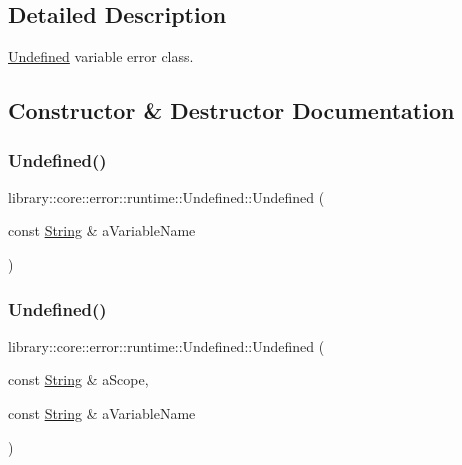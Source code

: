 \subsection{Detailed Description}
\hyperlink{classlibrary_1_1core_1_1error_1_1runtime_1_1Undefined}{Undefined} variable error class. 

\subsection{Constructor \& Destructor Documentation}
\mbox{\label{classlibrary_1_1core_1_1error_1_1runtime_1_1Undefined_a585cecbe505147926980971fed942b95}} 
\subsubsection{\texorpdfstring{Undefined()}{Undefined()}\hspace{0.1cm}{\footnotesize\ttfamily [1/2]}}
{\footnotesize\ttfamily library\+::core\+::error\+::runtime\+::\+Undefined\+::\+Undefined (\begin{DoxyParamCaption}\item[{const \hyperlink{classlibrary_1_1core_1_1types_1_1String}{String} \&}]{a\+Variable\+Name }\end{DoxyParamCaption})}

\mbox{\label{classlibrary_1_1core_1_1error_1_1runtime_1_1Undefined_a61e341571e36a63bd0894c82b6be7427}} 
\subsubsection{\texorpdfstring{Undefined()}{Undefined()}\hspace{0.1cm}{\footnotesize\ttfamily [2/2]}}
{\footnotesize\ttfamily library\+::core\+::error\+::runtime\+::\+Undefined\+::\+Undefined (\begin{DoxyParamCaption}\item[{const \hyperlink{classlibrary_1_1core_1_1types_1_1String}{String} \&}]{a\+Scope,  }\item[{const \hyperlink{classlibrary_1_1core_1_1types_1_1String}{String} \&}]{a\+Variable\+Name }\end{DoxyParamCaption})}

